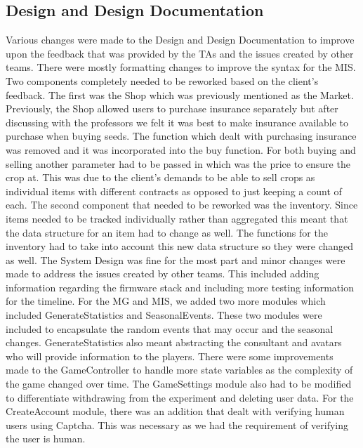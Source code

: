 \documentclass{article}
\begin{document}
\subsection{Design and Design Documentation}
Various changes were made to the Design and Design Documentation to improve upon the feedback that was provided by the TAs and the issues created by other teams. There were mostly formatting changes to improve the syntax for the MIS. Two components completely needed to be reworked based on the client's feedback. The first was the Shop which was previously mentioned as the Market. Previously, the Shop allowed users to purchase insurance separately but after discussing with the professors we felt it was best to make insurance available to purchase when buying seeds. The function which dealt with purchasing insurance was removed and it was incorporated into the buy function. For both buying and selling another parameter had to be passed in which was the price to ensure the crop at. This was due to the client's demands to be able to sell crops as individual items with different contracts as opposed to just keeping a count of each. The second component that needed to be reworked was the inventory. Since items needed to be tracked individually rather than aggregated this meant that the data structure for an item had to change as well. The functions for the inventory had to take into account this new data structure so they were changed as well. The System Design was fine for the most part and minor changes were made to address the issues created by other teams. This included adding information regarding the firmware stack and including more testing information for the timeline. For the MG and MIS, we added two more modules which included GenerateStatistics and SeasonalEvents. These two modules were included to encapsulate the random events that may occur and the seasonal changes. GenerateStatistics also meant abstracting the consultant and avatars who will provide information to the players. There were some improvements made to the GameController to handle more state variables as the complexity of the game changed over time. The GameSettings module also had to be modified to differentiate withdrawing from the experiment and deleting user data. For the CreateAccount module, there was an addition that dealt with verifying human users using Captcha. This was necessary as we had the requirement of verifying the user is human.
\end{document}
